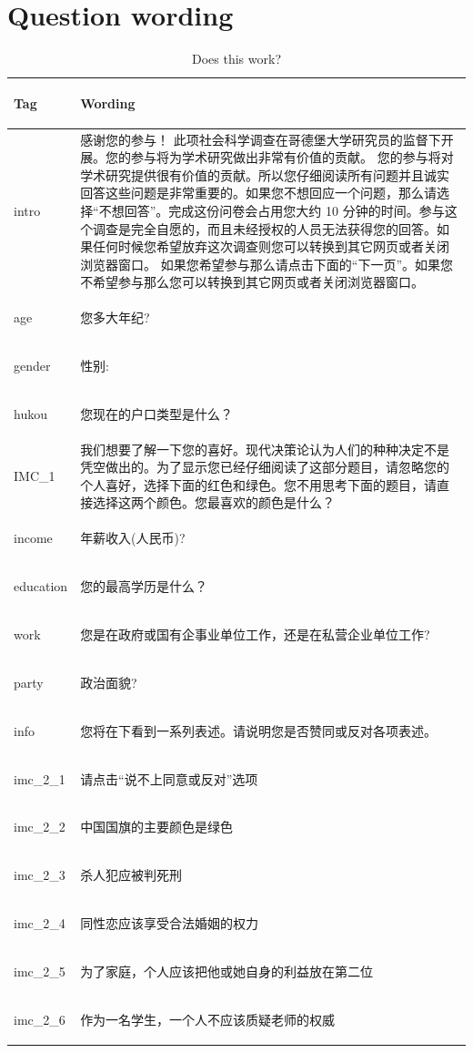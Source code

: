 \documentclass[]{article}
\begin{document}
\newpage

\hypertarget{question-wording}{%
\section{Question wording}\label{question-wording}}

\begin{longtabu} to 
\caption{\label{tab:unnamed-chunk-1}Does this work? \label{full-survey} }\\
\toprule
Tag & Wording\\
\midrule
intro & 感谢您的参与！ 
此项社会科学调查在哥德堡大学研究员的监督下开展。您的参与将为学术研究做出非常有价值的贡献。  您的参与将对学术研究提供很有价值的贡献。所以您仔细阅读所有问题并且诚实回答这些问题是非常重要的。如果您不想回应一个问题，那么请选择“不想回答”。完成这份问卷会占用您大约 10 分钟的时间。参与这个调查是完全自愿的，而且未经授权的人员无法获得您的回答。如果任何时候您希望放弃这次调查则您可以转换到其它网页或者关闭浏览器窗口。 如果您希望参与那么请点击下面的“下一页”。如果您不希望参与那么您可以转换到其它网页或者关闭浏览器窗口。\\
age & 您多大年纪?\\
gender & 性别:\\
hukou & 您现在的户口类型是什么？\\
IMC\_1 & 我们想要了解一下您的喜好。现代决策论认为人们的种种决定不是凭空做出的。为了显示您已经仔细阅读了这部分题目，请忽略您的个人喜好，选择下面的红色和绿色。您不用思考下面的题目，请直接选择这两个颜色。您最喜欢的颜色是什么？\\
\addlinespace
income & 年薪收入(人民币)?\\
education & 您的最高学历是什么？\\
work & 您是在政府或国有企事业单位工作，还是在私营企业单位工作?\\
party & 政治面貌?\\
info & 您将在下看到一系列表述。请说明您是否赞同或反对各项表述。\\
\addlinespace
imc\_2\_1 & 请点击“说不上同意或反对”选项\\
imc\_2\_2 & 中国国旗的主要颜色是绿色\\
imc\_2\_3 & 杀人犯应被判死刑\\
imc\_2\_4 & 同性恋应该享受合法婚姻的权力\\
imc\_2\_5 & 为了家庭，个人应该把他或她自身的利益放在第二位\\
\addlinespace
imc\_2\_6 & 作为一名学生，一个人不应该质疑老师的权威\\

\end{longtabu}
\end{document}

